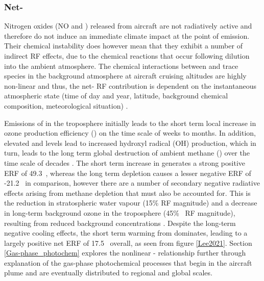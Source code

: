 \subsubsection{Net-}
Nitrogen oxides (NO and ) released from aircraft are not radiatively active and therefore do not induce an immediate climate impact at the point of emission. Their chemical instability does however mean that they exhibit a number of indirect RF effects, due to the chemical reactions that occur following dilution into the ambient atmosphere. The chemical interactions between  and trace species in the background atmosphere at aircraft cruising altitudes are highly non-linear and thus, the net- RF contribution is dependent on the instantaneous atmospheric state (time of day and year, latitude, background chemical composition, meteorological situation) \cite{Fritz2020, Kraabol2000b}. 

Emissions of  in the troposphere initially leads to the short term local increase in ozone production efficiency () on the time scale of weeks to months. In addition, elevated  and  levels lead to increased hydroxyl radical (OH) production, which in turn, leads to the long term global destruction of ambient methane () over the time scale of decades \cite{Stevenson2004, Wild2001, Myhre2011}. The short term increase in  generates a strong positive ERF of 49.3~, whereas the long term  depletion causes a lesser negative ERF of -21.2~ in comparison, however there are a number of secondary negative radiative effects arising from methane depletion that must also be accounted for. This is the reduction in stratospheric water vapour (15\%  RF magnitude) and a decrease in long-term background ozone in the troposphere (45\%~ RF magnitude), resulting from reduced background  concentrations \cite{Holmes2011, Myhre2007}. Despite the long-term negative cooling effects, the short term warming from  dominates, leading to a largely positive net ERF of 17.5~ overall, as seen from figure \ref{Lee2021}. Section \ref{Gas-phase_photochem} explores the nonlinear - relationship further through explanation of the gas-phase photochemical processes that begin in the aircraft plume and are eventually distributed to regional and global scales. 

